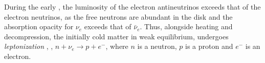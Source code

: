During the early \pmerg{}, the luminosity of the electron antineutrinos 
exceeds that of the electron neutrinos, 
as the 
free neutrons are abundant in the disk and the absorption opacity for $\nu_e$ 
exceeds that of $\bar{\nu}_e$.
Thus, alongside heating and decompression, the initially cold matter in weak 
equilibrium, undergoes \textit{leptonization} 
\citep{Perego:2014fma,Endrizzi:2019trv},
\ie, $n+\nu_e\rightarrow p + e^-$, 
where $n$ is a neutron, $p$ is a proton and $e^{-}$ is an electron. 






